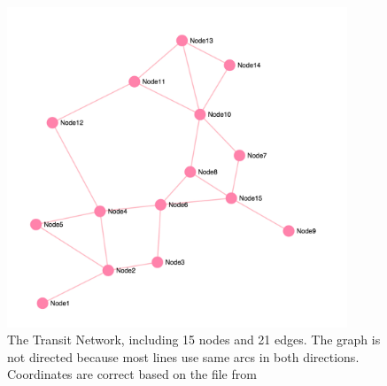 \begin{figure}[hb]
  \centering
  \includegraphics[width=4in]{assets/mandlnetwork.png}
  \caption[Transit Network]
   {The Transit Network, including 15 nodes and 21 edges. The graph is not directed because most lines use same arcs in both directions. Coordinates are correct based on the file from \citep{fan09}}
\end{figure}

